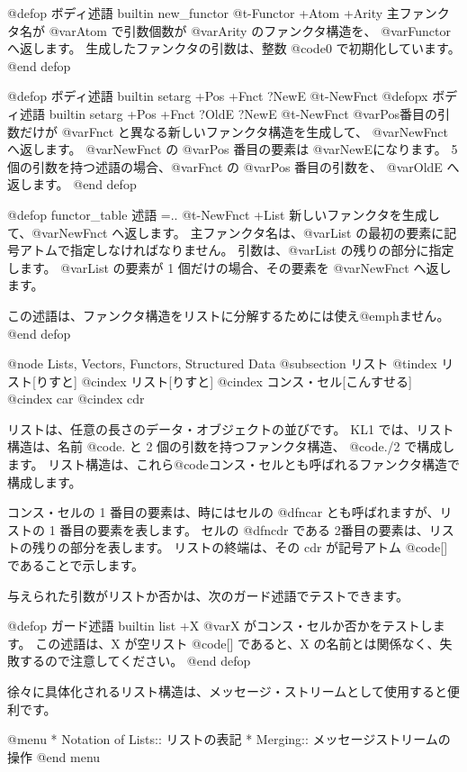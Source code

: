{{@defop {ボディ述語} {builtin} new_functor @t{-}Functor +Atom +Arity
主ファンクタ名が @var{Atom} で引数個数が @var{Arity} のファンクタ構造を、 @var{Functor} へ返します。
生成したファンクタの引数は、整数 @code{0} で初期化しています。
@end defop

@defop {ボディ述語} {builtin}  setarg +Pos +Fnct ?NewE @t{-}NewFnct
@defopx {ボディ述語} {builtin}  setarg +Pos +Fnct ?OldE ?NewE @t{-}NewFnct
@var{Pos}番目の引数だけが @var{Fnct} と異なる新しいファンクタ構造を生成して、 @var{NewFnct} へ返します。 
@var{NewFnct} の @var{Pos} 番目の要素は @var{NewE}になります。
 5 個の引数を持つ述語の場合、@var{Fnct} の @var{Pos} 番目の引数を、 @var{OldE} へ返します。
@end defop

@defop {functor_table} {述語} =.. @t{-}NewFnct +List
新しいファンクタを生成して、@var{NewFnct} へ返します。
主ファンクタ名は、@var{List} の最初の要素に記号アトムで指定しなければなりません。
引数は、@var{List} の残りの部分に指定します。
@var{List} の要素が 1 個だけの場合、その要素を @var{NewFnct} へ返します。

この述語は、ファンクタ構造をリストに分解するためには使え@emph{ません}。
@end defop

@node Lists, Vectors, Functors, Structured Data
@subsection リスト
@tindex リスト[りすと]
@cindex リスト[りすと]
@cindex コンス・セル[こんすせる]
@cindex car
@cindex cdr

リストは、任意の長さのデータ・オブジェクトの並びです。
KL1 では、リスト構造は、名前 @code{.} と 2 個の引数を持つファンクタ構造、 @code{./2} で構成します。
リスト構造は、これら@code{コンス・セル}とも呼ばれるファンクタ構造で構成します。

コンス・セルの 1 番目の要素は、時にはセルの @dfn{car} とも呼ばれますが、リストの 1 番目の要素を表します。
セルの @dfn{cdr} である 2番目の要素は、リストの残りの部分を表します。
リストの終端は、その cdr が記号アトム @code{[]} であることで示します。

与えられた引数がリストか否かは、次のガード述語でテストできます。

@defop {ガード述語} {builtin} list +X
@var{X} がコンス・セルか否かをテストします。
この述語は、X が空リスト @code{[]} であると、X の名前とは関係なく、失敗するので注意してください。 
@end defop

徐々に具体化されるリスト構造は、メッセージ・ストリームとして使用すると便利です。

@menu
* Notation of Lists::           リストの表記
* Merging::                     メッセージストリームの操作
@end menu

}}
